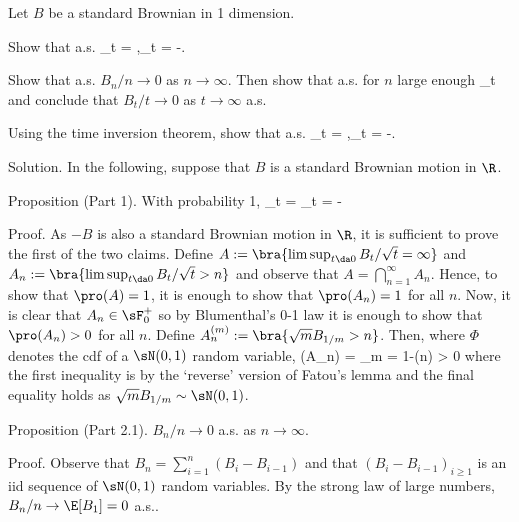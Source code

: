 \vspace{2mm}

\qcutline


\item\label{exe:2.2} Let $B$ be a standard Brownian in 1 dimension.
\ben
\item [(i)] Show that a.s.
\be
\limsup_{t}  = \infty,\qquad \liminf_{t}  = -\infty.
\ee
\item [(ii)] Show that a.s. $B_n/n \to 0$ as $n \to \infty$. Then show that a.s. for $n$ large enough
\be
\sup_{t\in [n,n+1]}  \leq {}
\ee
and conclude that $B_t/t \to 0$ as $t \to \infty$ a.s.

\item [(iii)] Using the time inversion theorem, show that a.s.
\be
\limsup_{t\to\infty}  = \infty,\qquad \liminf_{t\to\infty} = -\infty.
\ee
\een

\scutline

Solution. In the following, suppose that $B$ is a standard Brownian motion in $\R$.

Proposition (Part 1). With probability 1,
\be
\limsup_{t}  = \infty \qquad \liminf_{t}  = -\infty
\ee

Proof. As $-B$ is also a standard Brownian motion in $\R$, it is sufficient to prove the first of the two claims. Define $A := \bra{\limsup_{t\da 0} B_t / \sqrt{t} = \infty}$ and $A_n := \bra{\limsup_{t\da 0}B_t/\sqrt{t} > n}$ and observe that $A = \bigcap^\infty_{n=1}A_n$. Hence, to show that $\pro(A) = 1$, it is enough to show that $\pro(A_n) = 1$ for all $n$. Now, it is clear that $A_n \in \sF^+_0$ so by Blumenthal's 0-1 law it is enough to show that $\pro(A_n)>0$ for all $n$. Define $A^{(m)}_n := \bra{\sqrt{m}B_{1/m} >n}$. Then, where $\Phi$ denotes the cdf of a $\sN (0,1)$ random variable,
\be
\pro(A_n) = \pro{} \geq  \limsup_{m\to \infty} \pro{} = 1-\Phi(n) > 0
\ee
where the first inequality is by the `reverse' version of Fatou's lemma and the final equality holds as $\sqrt{m} B_{1/m} \sim \sN (0,1)$.

Proposition (Part 2.1). $B_n/n \to 0$ a.s. as $n\to \infty$.

Proof. Observe that $B_n =\sum^n_{i=1}(B_i-B_{i-1})$ and that $(B_i-B_{i-1})_{i\geq 1}$ is an iid sequence of $\sN (0,1)$ random variables. By the strong law of large numbers, $B_n/n \to \E[B_1] = 0$ a.s..


